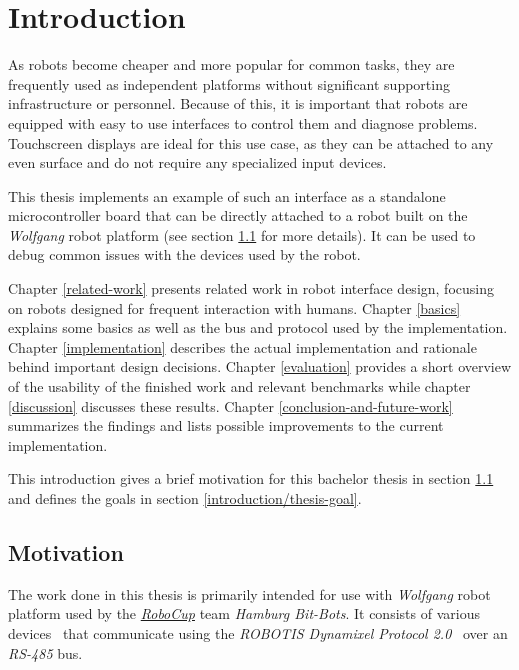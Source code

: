 \chapter{Introduction}
\label{introduction}

As robots become cheaper and more popular for common tasks, they are frequently used as independent
platforms without significant supporting infrastructure or personnel. Because of this, it is
important that robots are equipped with easy to use interfaces to control them and diagnose problems.
Touchscreen displays are ideal for this use case, as they can be attached to any even surface and do
not require any specialized input devices.

This thesis implements an example of such an interface as a standalone microcontroller board
that can be directly attached to a robot built on the \textit{Wolfgang} robot platform (see section
\ref{introduction/motivation} for more details). It can be used to debug common issues with the devices
used by the robot.

Chapter \ref{related-work} presents related work in robot interface design, focusing on robots
designed for frequent interaction with humans. Chapter \ref{basics} explains some basics as well
as the bus and protocol used by the implementation. Chapter \ref{implementation} describes the
actual implementation and rationale behind important design decisions. Chapter \ref{evaluation}
provides a short overview of the usability of the finished work and relevant benchmarks while chapter
\ref{discussion} discusses these results. Chapter \ref{conclusion-and-future-work} summarizes the
findings and lists possible improvements to the current implementation.

This introduction gives a brief motivation for this bachelor thesis in section \ref{introduction/motivation}
and defines the goals in section \ref{introduction/thesis-goal}.

\section{Motivation}
\label{introduction/motivation}

The work done in this thesis is primarily intended for use with \textit{Wolfgang} robot platform
used by the \href{https://www.robocup.org/}{\textit{RoboCup}} team \textit{Hamburg Bit-Bots}.
It consists of various devices~\cite{bit-bots-specs} that communicate using the 
\textit{ROBOTIS Dynamixel Protocol 2.0}~\cite{dynamixel-protocol-2} over an \textit{RS-485} bus.

